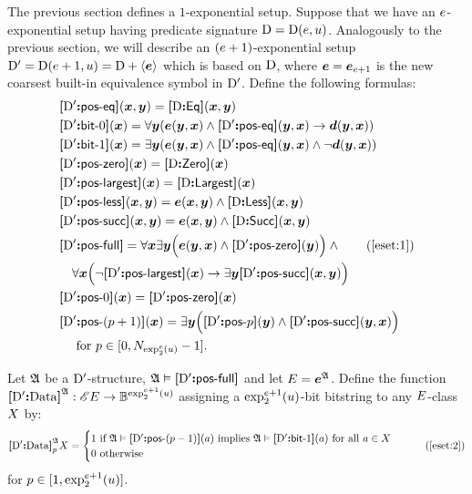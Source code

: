 The previous section defines a $1$-exponential setup.
Suppose that we have an $\sze$-exponential setup having predicate signature
$\DS = \DS(\sze,\szu)$. Analogously to the previous section, we will describe an
$(\sze+1)$-exponential setup $\DSp = \DS(\sze+1,\szu) = \DS + \seq{\se}$ which
is based on $\DS$, where $\se = \see{\sze+1}$ is the new coarsest built-in
equivalence symbol in $\DSp$. Define the following formulas:
\begin{align}
  &\fposeq\DSp(\xx,\yy) = \fEq\DS(\xx,\yy) \nonumber \\
  &\fbitO\DSp(\xx) = \forall\yy(\se(\yy,\xx) \land 
    \fposeq\DSp(\yy,\xx) \limp \sd(\yy, \xx)) \nonumber \\
  &\fbitI\DSp(\xx) = \exists\yy(\se(\yy,\xx) \land
    \fposeq\DSp(\yy,\xx) \land \lnot\sd(\yy,\xx)) \nonumber \\
  &\fposzero\DSp(\xx) = \fZero\DS(\xx) \nonumber \\
  &\fposmax\DSp(\xx) = \fLargest\DS(\xx) \nonumber \\
  &\fposless\DSp(\xx,\yy) = \se(\xx,\yy) \land
    \fLess\DS(\xx,\yy) \nonumber \\
  &\fpossucc\DSp(\xx,\yy) = \se(\xx,\yy) \land
    \fSucc\DS(\xx,\yy) \nonumber \\
  &\fposfull\DSp = \forall\xx\exists\yy\Big(\se(\yy,\xx) \land 
    \fposzero\DSp(\yy)\Big) \land \tag{\ref{eset:1}}\\
    &\quad\forall\xx\Big(\lnot\fposmax\DSp(\xx) \limp
    \exists\yy\fpossucc\DSp(\xx,\yy)\Big) \nonumber \\
  &\fposA\DSp0(\xx) = \fposzero\DSp(\xx) \nonumber \\
  &\fposA\DSp{(\posp+1)}(\xx) = \exists\yy\Big(
    \fposA\DSp\posp(\yy) \land \fpossucc\DSp(\yy,\xx)
  \Big) \nonumber \\
    &\quad\text{ for } \posp \in [0,\largtbit{\tetr\sze2\szu}-1].\nonumber
\end{align}

Let $\StrA$ be a $\DSp$-structure, $\StrA \vDash \fposfull\DSp$ and let
$\relE=\at\StrA\se$.
Define the function $\Data\DSp\StrA : \Ecl\relE \to
\tBitstrings{\tetr{\sze+1}2\szu}$ assigning a $\tetr{\sze+1}2\szu$-bit
bitstring to any $\relE$-class $\eclX$ by:
\begin{equation}
  \Data\DSp\StrA_\posp\eclX = \begin{cases}
  1 \text{ if } \StrA \vDash \fposA\DSp{(\posp-1)}(\ea) 
  \text{ implies } \StrA \vDash \fbitI\DSp(\ea)
  \text{ for all } \ea \in \eclX
  \\
  0 \text{ otherwise}
  \end{cases}\tag{\ref{eset:2}}
\end{equation}
for $\posp \in [1,\tetr{\sze+1}2\szu]$.

